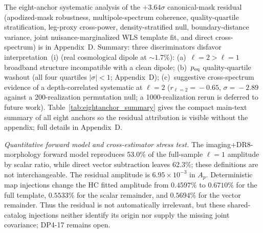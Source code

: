 \documentclass[aps,prd,twocolumn,superscriptaddress,preprintnumbers,nofootinbib,longbibliography,floatfix]{revtex4-2}
\newcommand{\sigmaunit}{\sigma}
\begin{document}
The eight-anchor systematic analysis of the $+3.64\sigmaunit$ canonical-mask residual (apodized-mask robustness, multipole-spectrum coherence, quality-quartile stratification, leg-proxy cross-power, density-stratified null, boundary-distance variance, joint nuisance-marginalized WLS template fit, and direct cross-spectrum) is in Appendix~D. Summary: three discriminators disfavor interpretation~(i) (real cosmological dipole at $\sim\!1.7\%$): (a)~$\ell\!=\!2 > \ell\!=\!1$ broadband structure incompatible with a clean dipole; (b)~$p_{\rm eq}$ quality-quartile washout (all four quartiles $|\sigma|<1$; Appendix~D); (c)~suggestive cross-spectrum evidence of a depth-correlated systematic at $\ell\!=\!2$ ($r_{\ell=2}\!=\!-0.65$, $\sigma\!=\!-2.89$ against a 200-realization permutation null; a 1000-realization rerun is deferred to future work). Table~\ref{tab:eightanchor_summary} gives the compact main-text summary of all eight anchors so the residual attribution is visible without the appendix; full details in Appendix~D.

\emph{Quantitative forward model and cross-estimator stress test.} The imaging+DR8-morphology forward model reproduces 53.0\% of the full-sample $\ell=1$ amplitude by scalar ratio, while direct vector subtraction leaves 62.3\%; these definitions are not interchangeable. The residual amplitude is $6.95\times10^{-3}$ in $A_p$. Deterministic map injections change the HC fitted amplitude from $0.4597\%$ to $0.6710\%$ for the full template, $0.5533\%$ for the scalar remainder, and $0.5694\%$ for the vector remainder. Thus the residual is not automatically irrelevant, but these shared-catalog injections neither identify its origin nor supply the missing joint covariance; DP4-17 remains open.
\end{document}
